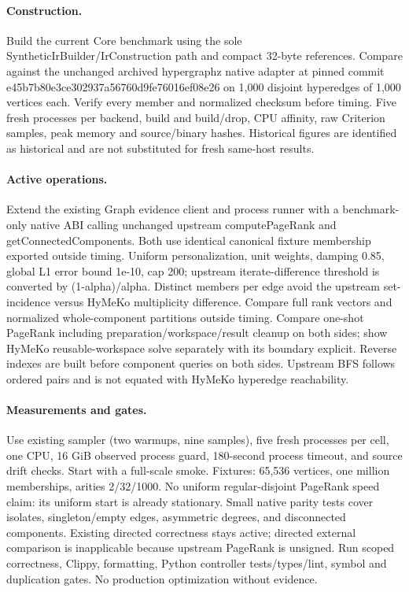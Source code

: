 \documentclass[11pt,a4paper]{article}
\begin{document}
\paragraph{Construction.} Build the current Core benchmark using the sole
SyntheticIrBuilder/IrConstruction path and compact 32-byte references. Compare
against the unchanged archived hypergraphz native adapter at pinned commit
e45b7b80e3ce302937a56760d9fe76016ef08e26 on 1,000 disjoint hyperedges of 1,000
vertices each. Verify every member and normalized checksum before timing.
Five fresh processes per backend, build and build/drop, CPU affinity, raw
Criterion samples, peak memory and source/binary hashes. Historical figures are
identified as historical and are not substituted for fresh same-host results.
\paragraph{Active operations.} Extend the existing Graph evidence client and
process runner with a benchmark-only native ABI calling unchanged upstream
computePageRank and getConnectedComponents. Both use identical canonical fixture
membership exported outside timing. Uniform personalization, unit weights,
damping 0.85, global L1 error bound 1e-10, cap 200; upstream iterate-difference
threshold is converted by (1-alpha)/alpha. Distinct members per edge avoid the
upstream set-incidence versus HyMeKo multiplicity difference. Compare full rank
vectors and normalized whole-component partitions outside timing. Compare
one-shot PageRank including preparation/workspace/result cleanup on both sides;
show HyMeKo reusable-workspace solve separately with its boundary explicit.
Reverse indexes are built before component queries on both sides. Upstream BFS
follows ordered pairs and is not equated with HyMeKo hyperedge reachability.
\paragraph{Measurements and gates.} Use existing sampler (two warmups, nine
samples), five fresh processes per cell, one CPU, 16 GiB observed process guard,
180-second process timeout, and source drift checks. Start with a full-scale smoke.
Fixtures: 65,536 vertices, one million memberships, arities 2/32/1000. No uniform
regular-disjoint PageRank speed claim: its uniform start is already stationary.
Small native parity tests cover isolates, singleton/empty edges, asymmetric
degrees, and disconnected components. Existing directed correctness stays active;
directed external comparison is inapplicable because upstream PageRank is unsigned.
Run scoped correctness, Clippy, formatting, Python controller tests/types/lint,
symbol and duplication gates. No production optimization without evidence.
\end{document}
